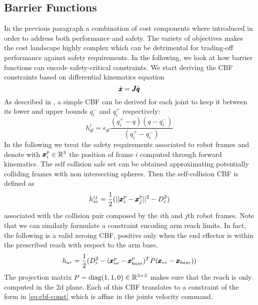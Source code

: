 \subsection{Barrier Functions}
In the previous paragraph a combination of cost components where introduced in order to address both performance and safety. The variety of objectives makes the cost landscape highly complex which can be detrimental for trading-off performance against safety requirements. In the following, we look at how barrier functions can encode safety-critical constraints. We start deriving the CBF constraints based on differential kinematics equation
\begin{equation}
    \dot{\pmb{x}} = \pmb{J} \dot{\pmb{q}}
\end{equation}
As described in \cite{benzi2021optimization}, a simple CBF can be derived for each joint to keep it between its lower and upper bounds $q_i^-$ and $q_i^+$ respectively:
\begin{equation}
h_{ql}^i = \epsilon_{ql} \frac{(q_i^+ - q)(q - q_i^-)}{(q_i^+ - q_i^-)}
\end{equation}
In the following we treat the safety requirements associated to robot frames and denote with $\pmb{x}^p_{i} \in \mathbb{R}^{3}$ the position of frame $i$ computed through forward kinematics.  
The self collision safe set can be obtained approximating potentially colliding frames with non intersecting spheres. Then the self-collision CBF is defined as
\begin{equation}
    h_{sc}^{ij} = \frac{1}{2}(||\pmb{x}^p_i - \pmb{x}^p_j||^2 - D_c^2)
\end{equation}
associated with the collision pair composed by the $i$th  and $j$th robot frames. Note that we can similarly formulate a constraint encoding arm reach limits. In fact, the following is a valid zeroing CBF, positive only when the end effector is within the prescribed reach with respect to the arm base,
\begin{equation}
    h_{ar} = \frac{1}{2}(D_r^2 - (\pmb{x}^p_{ee} - \pmb{x}^p_{base})^T P (\pmb{x}_{ee} - \pmb{x}_{base}) )
\end{equation}
The projection matrix $P = \text{diag}(1, 1, 0) \in \mathbb{R}^{3 \times 3}$ makes sure that the reach is only computed in the 2d plane. Each of this CBF translates to a constraint of the form in \eqn \ref{eq:cbf-const} which is affine in the joints velocity command. 

